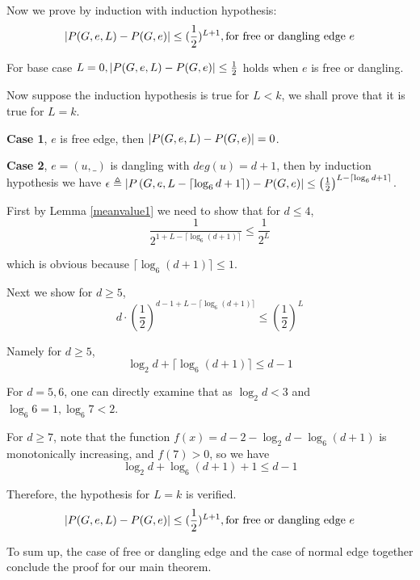 		Now we prove by induction with induction hypothesis:
		\[\left\vert P(G,e,L) - P(G,e)\right\vert \leq (\frac{1}{2})^{L+1}, \textrm{for free or dangling edge $e$}\]
		
		For base case $L=0, \left\vert P(G,e,L) - P(G,e)\right\vert \leq \frac{1}{2}$ holds when $e$ is free or dangling.

		Now suppose the induction hypothesis is true for $L<k$, we shall prove that it is true for $L=k$.

		{\bf Case 1}, $e$ is free edge, then $\left\vert P(G,e,L) - P(G,e)\right\vert = 0$.

		{\bf Case 2}, $e=(u,\_)$ is dangling with $deg(u)=d+1$, then by induction hypothesis we have
		$\epsilon \triangleq \left\vert P\left(G,e,L-\lceil \log_6{d+1}\rceil \right) - P(G,e)\right\vert \leq \left(\frac{1}{2}\right)^{L-\lceil \log_6{d+1}\rceil}$.

		First by Lemma \ref{meanvalue1} we need to show that for $d \leq 4$,
		\[\frac{1}{2^{1+L-\lceil \log_6{(d+1)}\rceil}} \leq \frac{1}{2^L}\]

		which is obvious because $\lceil\log_6{(d+1)}\rceil \leq 1$.

		Next we show for $d \geq 5$,
		\[ d\cdot \left( \frac{1}{2} \right)^{d-1 + L - \lceil \log_6{(d+1)}\rceil}  \leq \left( \frac{1}{2} \right)^L \]

		Namely for $d \geq 5$,
		\[ \log_2 d + \lceil \log_6{(d+1)} \rceil \leq d-1\]

		For $d=5,6$, one can directly examine that as $\log_2 d < 3$ and $\log_6 6 =1, \log_6 7 < 2$.


		For $d\geq 7$, note that the function $f(x) = d-2 -\log_2 d - \log_6{(d+1)}$ is monotonically increasing, and $f(7)>0$, so we have
        \[ \log_2 d + \log_6{(d+1)} + 1 \leq d-1\]

%
%
%
%

		Therefore, the hypothesis for $L=k$ is verified.
		\[\left\vert P(G,e,L) - P(G,e)\right\vert \leq (\frac{1}{2})^{L+1}, \textrm{for free or dangling edge $e$}\]

		
		To sum up, the case of free or dangling edge and the case of normal edge together conclude the proof for our main theorem.
